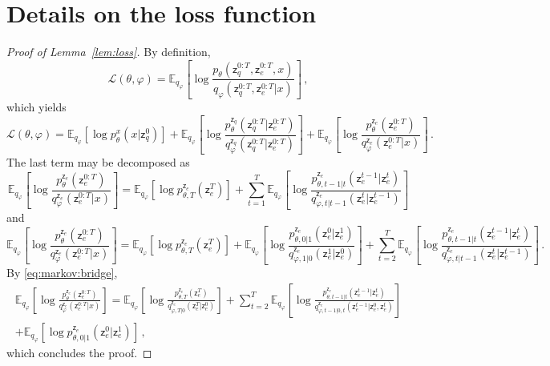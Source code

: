 \documentclass{article}
\theoremstyle{plain}
\theoremstyle{definition}
\theoremstyle{remark}
\newcommand{\latentcont}{\mathsf{z}_e}
\newcommand{\latentdis}{\mathsf{z}_q}
\begin{document}
\section{Details on the loss function}
\label{ap:loss}
\begin{proof}[Proof of Lemma~\ref{lem:loss}]
By definition,
$$
\mathcal{L}(\theta,\varphi) = \mathbb{E}_{q_{\varphi}}\left[\log \frac{p_{\theta}(\latentdis^{0:T},\latentcont^{0:T},x)}{q_{\varphi}(\latentdis^{0:T},\latentcont^{0:T}| x)}\right]\,,
$$
which yields
$$
 \mathcal{L}(\theta,\varphi) = \mathbb{E}_{q_{\varphi}}\left[\log p^x_{\theta}(x|\latentdis^{0})\right]   + \mathbb{E}_{q_{\varphi}}\left[\log \frac{p^{\latentdis}_{\theta}(\latentdis^{0:T}|\latentcont^{0:T})}{q^{\latentdis}_{\varphi}(\latentdis^{0:T}|\latentcont^{0:T})}\right] +\mathbb{E}_{q_{\varphi}}\left[\log \frac{p^{\latentcont}_{\theta}(\latentcont^{0:T})}{q^{\latentcont}_{\varphi}(\latentcont^{0:T}| x)}\right]\,.
$$
The last term may be decomposed as
$$
\mathbb{E}_{q_{\varphi}}\left[\log \frac{p^{\latentcont}_{\theta}(\latentcont^{0:T})}{q^{\latentcont}_{\varphi}(\latentcont^{0:T}| x)}\right] = \mathbb{E}_{q_{\varphi}}\left[\log p^{\latentcont}_{\theta,T}(\latentcont^{T})\right] + \sum_{t=1}^T \mathbb{E}_{q_{\varphi}}\left[\log \frac{p^{\latentcont}_{\theta,t-1|t}(\latentcont^{t-1}|\latentcont^{t})}{q^{\latentcont}_{\varphi,t|t-1}(\latentcont^{t}|\latentcont^{t-1})}\right]
$$
and
$$
\mathbb{E}_{q_{\varphi}}\left[\log \frac{p^{\latentcont}_{\theta}(\latentcont^{0:T})}{q^{\latentcont}_{\varphi}(\latentcont^{0:T}| x)}\right] = \mathbb{E}_{q_{\varphi}}\left[\log p^{\latentcont}_{\theta,T}(\latentcont^{T})\right] +\mathbb{E}_{q_{\varphi}}\left[\log \frac{p^{\latentcont}_{\theta,0|1}(\latentcont^{0}|\latentcont^{1})}{q^{\latentcont}_{\varphi,1|0}(\latentcont^{1}|\latentcont^{0})}\right] + \sum_{t=2}^T \mathbb{E}_{q_{\varphi}}\left[\log \frac{p^{\latentcont}_{\theta,t-1|t}(\latentcont^{t-1}|\latentcont^{t})}{q^{\latentcont}_{\varphi,t|t-1}(\latentcont^{t}|\latentcont^{t-1})}\right]\,.
$$
By \eqref{eq:markov:bridge},
\begin{multline*}
\mathbb{E}_{q_{\varphi}}\left[\log \frac{p^{\latentcont}_{\theta}(\latentcont^{0:T})}{q^{\latentcont}_{\varphi}(\latentcont^{0:T}| x)}\right] = \mathbb{E}_{q_{\varphi}}\left[\log \frac{p^{\latentcont}_{\theta,T}(\latentcont^{T})}{q^{\latentcont}_{\varphi,T|0}(\latentcont^{T}|\latentcont^{0})}\right] + \sum_{t=2}^T \mathbb{E}_{q_{\varphi}}\left[\log \frac{p^{\latentcont}_{\theta,t-1|t}(\latentcont^{t-1}|\latentcont^{t})}{q^{\latentcont}_{\varphi,t-1|0,t}(\latentcont^{t-1}|\latentcont^{0},\latentcont^{t})}\right] \\+ \mathbb{E}_{q_{\varphi}}\left[\log p^{\latentcont}_{\theta,0|1}(\latentcont^{0}|\latentcont^{1})\right]\,,
\end{multline*}
which concludes the proof.
\end{proof}
\end{document}
